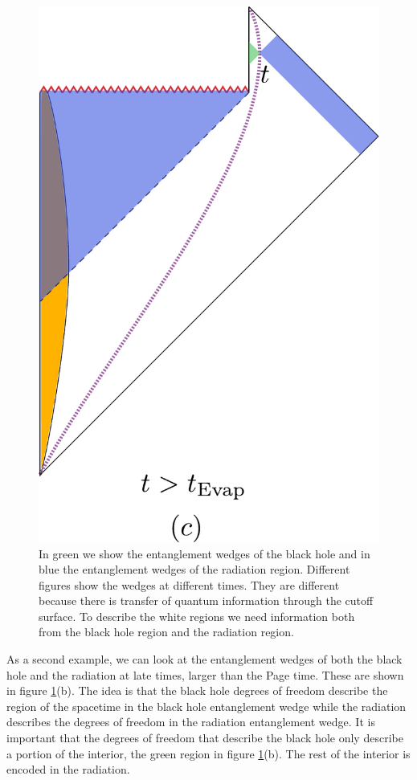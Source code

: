 \begin{figure}[ht]
\begin{center}
\includegraphics[scale=.35]{figures/EWc.pdf} 
\caption{ In green we show the entanglement wedges of the black hole and in blue the entanglement wedges of the radiation region. Different figures show the wedges at different times. They are different because there is transfer of quantum information through the cutoff surface. To describe the white regions we need information both from the black hole region and the radiation region.   }
\label{EWfig}
\end{center}
\end{figure}


As a second   example, we can look at the entanglement wedges of both the black hole and the radiation at late times, larger than the Page time. These are shown in figure \ref{EWfig}(b). 
The idea is that the black hole degrees of freedom describe the region of the spacetime in the black hole entanglement wedge while the radiation describes the degrees of freedom in the radiation entanglement wedge. It is important that the degrees of freedom that describe the black hole only describe a portion of the interior, the green region in figure \ref{EWfig}(b). The rest of the interior is encoded in the radiation. 

